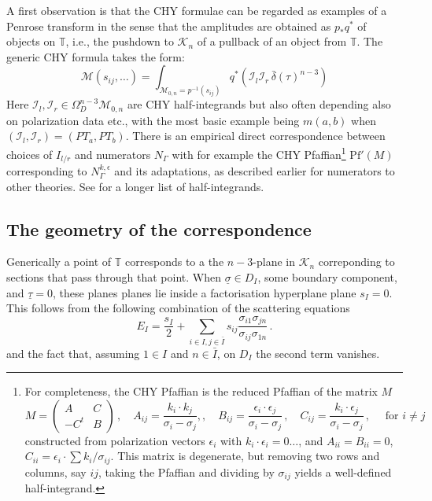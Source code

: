 \documentclass[11pt]{article}
\newcommand{\T}{\mathbb{T}}
\newcommand{\cK}{\mathcal{K}}
\newcommand{\cI}{\mathcal{I}}
\newcommand{\cM}{\mathcal{M}}
\newcommand{\Pf}{\mathrm{Pf}}
\newcommand{\bs}{\underline{\sigma}}
\newcommand{\bt}{\underline{\tau}}
\newcommand{\1}{{\rm 1\hskip-0.25em I}}
\begin{document}
A first observation is that the CHY formulae can be regarded as examples of a Penrose transform in the sense that the amplitudes are obtained as $p_*q^*$  of objects on $\T$, i.e., the pushdown to $\cK_n$ of a pullback of an object from $\T$.  The generic CHY formula takes the form:
\begin{equation}
\cM(s_{ij},\ldots)=\int_{\cM_{0,n}=p^{-1}(s_{ij})} q^*\left(\cI_l \cI_r \,\bar \delta(\tau)^{n-3}\right)
\end{equation}
 Here $\cI_l, \cI_r \in \Omega^{n-3}_D\cM_{0,n}$ are CHY half-integrands but also often depending also on polarization data etc.,  with the most basic example being $m(a,b)$ when  $(\cI_l,\cI_r)=(PT_a,PT_b)$.
 There is an empirical direct correspondence between choices of $I_{l/r}$ and numerators  $N_\Gamma$ with for example the CHY Pfaffian\footnote{For completeness, the CHY Pfaffian is the reduced Pfaffian of the matrix $M$ 
 $$
M=\begin{pmatrix}A&C\\-C^t&B\end{pmatrix}\, ,\quad 
A_{ij}=\frac{k_i\cdot k_j}{\sigma_i-\sigma_j}, , \quad B_{ij}=\frac{\epsilon_{i}\cdot \epsilon_{j}}{\sigma_i-\sigma_j}\, , \quad C_{ij}=\frac{k_i\cdot \epsilon_{j}}{\sigma_i-\sigma_j}\, , \quad \mbox{ for }i\neq j
$$
 constructed from polarization vectors $\epsilon_{i}$  with $k_i\cdot \epsilon_{i}=0 \ldots$, and $A_{ii}=B_{ii}=0$, $C_{ii}=\epsilon_{i}\cdot \sum k_i/\sigma_{ij}$. This matrix is degenerate, but removing two rows and columns, say $ij$, taking the Pfaffian and dividing by $\sigma_{ij}$ yields a well-defined half-integrand. 
} $\Pf'(M)$ corresponding to $N^{k,\epsilon}_\Gamma$ and its adaptations, as described earlier for numerators to other theories.   See \cite{Cachazo:2014xea} for a longer list of half-integrands.



\subsection{The geometry of the correspondence}
Generically a point of $\T$ corresponds to a the $n-3$-plane in $\cK_n$ correponding to sections that pass through that point. 
When $\bs \in D_I$, some boundary component,  and $\bt=0$,   these planes planes lie inside a factorisation hyperplane plane $s_I=0$. 
This follows from the following  combination \cite{Dolan:2013isa} of the scattering equations
\begin{equation}
E_I=\frac{s_I}{2} + \sum_{i\in I, j\in \bar I} s_{ij} \frac{\sigma_{i1}\sigma_{jn}}{\sigma_{ij}\sigma_{1n}}\, .
\end{equation}
and the fact that, assuming $1\in I$ and $n\in \bar I$, on $D_I$ the second term vanishes.
\end{document}
